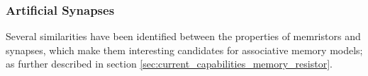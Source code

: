 %

%
%

\subsubsection{Artificial Synapses}


Several similarities have been identified between the properties of memristors and synapses, which make them interesting candidates for associative memory models; as further described in section \ref{sec:current_capabilities_memory_resistor}.


%


%

%

%

%

